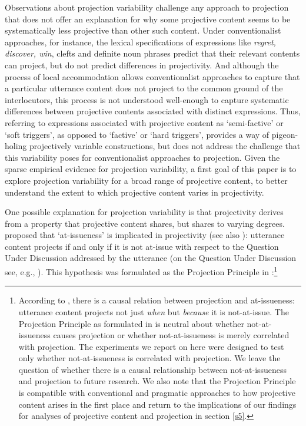 \documentclass[11pt,fleqn]{article}
\newcommand{\6}{\mbox{$[\hspace*{-.6mm}[$}}
\newcommand{\9}{\mbox{$]\hspace*{-.6mm}]$}}
\begin{document}
Observations about projection variability challenge any approach to projection that does not offer an explanation for why some projective content seems to be systematically less projective than other such content. Under conventionalist approaches, for instance, the lexical specifications of expressions like {\em regret, discover, win}, clefts and definite noun phrases predict that their relevant contents can project, but do not predict differences in projectivity. And although the process of local accommodation allows conventionalist approaches to capture that a particular utterance content does not project to the common ground of the interlocutors, this process is not understood well-enough to capture systematic differences between projective contents associated with distinct expressions. Thus, referring to expressions associated with projective content as `semi-factive' or `soft triggers', as opposed to `factive' or `hard triggers', provides a way of pigeon-holing projectively variable constructions, but does not address the challenge that this variability poses for conventionalist approaches to projection.  Given the sparse empirical evidence for projection variability, a first goal of this paper is to explore projection variability for a broad range of projective content, to better understand the extent to which projective content varies in projectivity. 

One possible explanation for projection variability is that projectivity derives from a property that projective content shares, but shares to varying degrees. \citet{brst-salt10} proposed that `at-issueness' is implicated in projectivity (see also \citealt{abrusan2011}): utterance content projects if and only if it is not at-issue with respect to the Question Under Discussion addressed by the utterance (on the Question Under Discussion see, e.g., \citealt{roberts12}). This hypothesis was formulated as the Projection Principle in \citealt[280]{brst-ar}:\footnote{According to \citealt[315]{brst-salt10}, there is a causal relation between projection and at-issueness: utterance content projects not just {\em when} but {\em because} it is not-at-issue. The Projection Principle as formulated in \citealt{brst-ar} is neutral about whether not-at-issueness causes projection or whether not-at-issueness is merely correlated with projection. The experiments we report on here were designed to test only whether not-at-issueness is correlated with projection. We leave the question of whether there is a causal relationship between not-at-issueness and projection to future research. We also note that the Projection Principle is compatible with conventional and pragmatic approaches to how projective content arises in the first place and return to the implications of our findings for analyses of projective content and projection in section \ref{s5}.}
\end{document}
